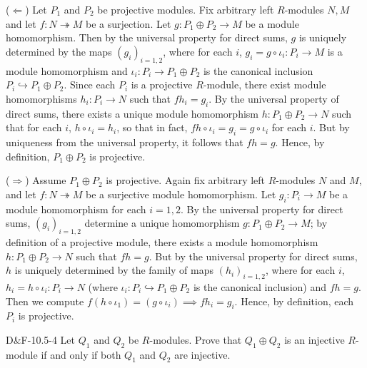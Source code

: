 \documentclass{article}
\newcommand{\embedd}{\hookrightarrow}
\begin{document}
	($\Leftarrow$) Let $P_{1}$ and $P_{2}$ be projective modules. Fix arbitrary left $R$-modules $N, M$ and let $f: N \twoheadrightarrow M$ be a surjection. Let $g: P_{1} \oplus P_{2} \to M$ be a module homomorphism. Then by the universal property for direct sums, $g$ is uniquely determined by the maps $(g_{i})_{i = 1,2}$, where for each $i$, $g_{i} = g \circ \iota_{i}: P_{i} \to M$ is a module homomorphism and $\iota_{i}: P_{i} \to P_{1} \oplus P_{2}$ is the canonical inclusion $P_{i}\embedd P_{1} \oplus P_{2}$. Since each $P_{i}$ is a projective $R$-module, there exist module homomorphisms $h_{i}: P_{i} \to N$ such that $fh_{i} = g_{i}$. By the universal property of direct sums, there exists a unique module homomorphism $h: P_{1} \oplus P_{2} \to N$ such that for each $i$, $h \circ \iota_{i} = h_{i}$, so that in fact, $fh \circ \iota_{i} = g_{i} = g \circ \iota_{i}$ for each $i$. But by uniqueness from the universal property, it follows that $fh = g$. Hence, by definition, $P_{1} \oplus P_{2}$ is projective. 
	
	($\Rightarrow$) Assume $P_{1} \oplus P_{2}$ is projective. Again fix arbitrary left $R$-modules $N$ and $M$, and let $f: N \twoheadrightarrow M$ be a surjective module homomorphism. Let $g_{i}: P_{i} \to M$ be a module homomorphism for each $i = 1, 2$. By the universal property for direct sums, $(g_{i})_{i = 1,2}$ determine a unique homomorphism $g: P_{1} \oplus P_{2}\to M$; by definition of a projective module, there exists a module homomorphism $h: P_{1} \oplus P_{2} \to N$ such that $fh = g$. But by the universal property for direct sums, $h$ is uniquely determined by the family of maps $(h_{i})_{i = 1,2}$, where for each $i$, $h_{i} = h \circ \iota_{i}: P_{i} \to N$ (where $\iota_{i}: P_{i} \embedd P_{1} \oplus P_{2}$ is the canonical inclusion) and $fh = g$. Then we compute $f(h \circ \iota_{1}) = (g \circ \iota_{i}) \implies fh_{i} = g_{i}$. Hence, by definition, each $P_{i}$ is projective. 
	
	\begin{prb}{D\&F-10.5-4}
		Let $Q_{1}$ and $Q_{2}$ be $R$-modules. Prove that $Q_{1} \oplus Q_{2}$ is an injective $R$-module if and only if both $Q_{1}$ and $Q_{2}$ are injective. 
	\end{prb}
	
\end{document}
